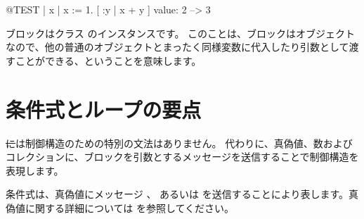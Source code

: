 \documentclass[a4paper,10pt,twoside]{book}
\begin{document}
\begin{code}{@TEST}
| x |
x := 1.
[ :y | x + y ] value: 2 --> 3
\end{code}

ブロックはクラス  のインスタンスです。
このことは、ブロックはオブジェクトなので、他の普通のオブジェクトとまったく同様変数に代入したり引数として渡すことができる、ということを意味します。






\section{条件式とループの要点}

\st には制御構造のための特別の文法はありません。
代わりに、真偽値、数およびコレクションに、ブロックを引数とするメッセージを送信することで制御構造を表現します。

条件式は、真偽値にメッセージ 、 あるいは  を送信することにより表します。真偽値に関する詳細については を参照してください。
\end{document}

